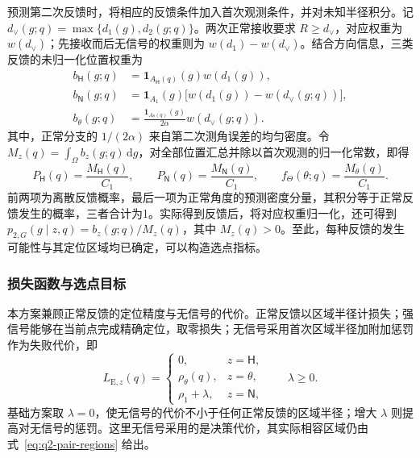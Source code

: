 预测第二次反馈时，将相应的反馈条件加入首次观测条件，并对未知半径积分。记 \(d_\vee(g;q)=\max\{d_1(g),d_2(g;q)\}\)。两次正常接收要求 \(R\ge d_\vee\)，对应权重为 \(w(d_\vee)\)；先接收而后无信号的权重则为 \(w(d_1)-w(d_\vee)\)。结合方向信息，三类反馈的未归一化位置权重为
\begin{equation}
\begin{aligned}
 b_{\mathsf H}(g;q)&=\mathbf1_{A_{\mathsf H}(q)}(g)w(d_1(g)),\\
 b_{\mathsf N}(g;q)&=\mathbf1_{A_1}(g)\bigl[w(d_1(g))-w(d_\vee(g;q))\bigr],\\
 b_\theta(g;q)&=\frac{\mathbf1_{A_\theta(q)}(g)}{2\alpha}w(d_\vee(g;q)).
\end{aligned}
\label{eq:q2-pair-feedback-weights}
\end{equation}
其中，正常分支的 \(1/(2\alpha)\) 来自第二次测角误差的均匀密度。令 \(M_z(q)=\int_\Omega b_z(g;q)\,\mathrm dg\)，对全部位置汇总并除以首次观测的归一化常数，即得
\begin{equation}
 P_{\mathsf H}(q)=\frac{M_{\mathsf H}(q)}{C_1},\qquad
 P_{\mathsf N}(q)=\frac{M_{\mathsf N}(q)}{C_1},\qquad
 f_\Theta(\theta;q)=\frac{M_\theta(q)}{C_1}.
\label{eq:q2-pair-prediction}
\end{equation}
前两项为离散反馈概率，最后一项为正常角度的预测密度分量，其积分等于正常反馈发生的概率，三者合计为1。实际得到反馈后，将对应权重归一化，还可得到 \(p_{2,G}(g\mid z,q)=b_z(g;q)/M_z(q)\)，其中 \(M_z(q)>0\)。至此，每种反馈的发生可能性与其定位区域均已确定，可以构造选点指标。

\subsubsection{损失函数与选点目标}

本方案兼顾正常反馈的定位精度与无信号的代价。正常反馈以区域半径计损失；强信号能够在当前点完成精确定位，取零损失；无信号采用首次区域半径加附加惩罚作为失败代价，即
\begin{equation}
 L_{\mathrm E,z}(q)=
 \begin{cases}
 0,&z=\mathsf H,\\
 \rho_\theta(q),&z=\theta,\\
 \rho_1+\lambda,&z=\mathsf N,
 \end{cases}
 \qquad \lambda\ge0.
\label{eq:q2-pair-expected-loss}
\end{equation}
基础方案取 \(\lambda=0\)，使无信号的代价不小于任何正常反馈的区域半径；增大 \(\lambda\) 则提高对无信号的惩罚。这里无信号采用的是决策代价，其实际相容区域仍由式~\eqref{eq:q2-pair-regions} 给出。

